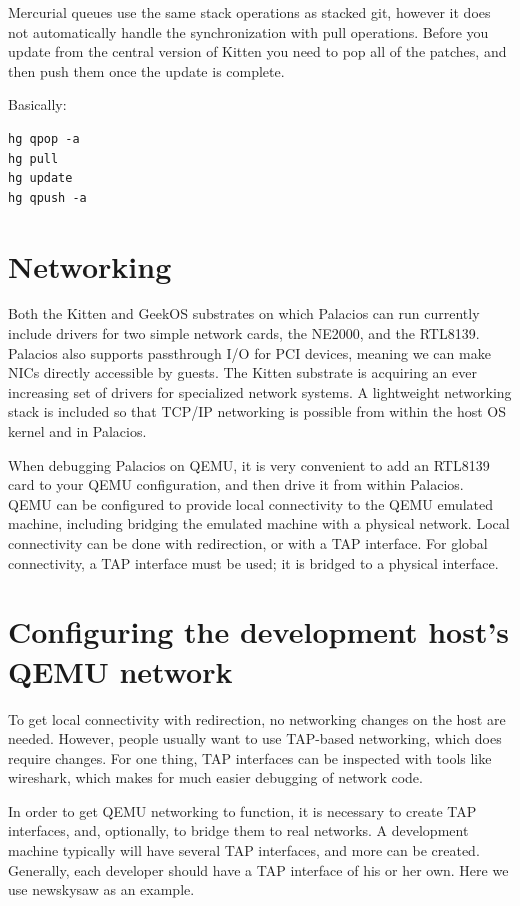 \documentclass[11pt]{article}
\begin{document}
Mercurial queues use the same stack operations as stacked git, however
it does not automatically handle the synchronization with pull
operations. Before you update from the central version of Kitten you
need to pop all of the patches, and then push them once the update is
complete.

Basically:
\begin{verbatim}
hg qpop -a
hg pull
hg update
hg qpush -a
\end{verbatim}



\section{Networking}

Both the Kitten and GeekOS substrates on which Palacios can run
currently include drivers for two simple network cards, the NE2000,
and the RTL8139.  Palacios also supports passthrough I/O for PCI
devices, meaning we can make NICs directly accessible by guests. The
Kitten substrate is acquiring an ever increasing set of drivers for
specialized network systems.  A lightweight networking stack is
included so that TCP/IP networking is possible from within the host OS
kernel and in Palacios.

When debugging Palacios on QEMU, it is very convenient to add an
RTL8139 card to your QEMU configuration, and then drive it from within
Palacios.  QEMU can be configured to provide local connectivity to the
QEMU emulated machine, including bridging the emulated machine with a
physical network.  Local connectivity can be done with redirection, or
with a TAP interface.  For global connectivity, a TAP interface must
be used; it is bridged to a physical interface.

\section{Configuring the development host's QEMU network}

To get local connectivity with redirection, no networking changes on
the host are needed.  However, people usually want to use TAP-based
networking, which does require changes.  For one thing, TAP interfaces
can be inspected with tools like wireshark, which makes for much
easier debugging of network code.

In order to get QEMU networking to function, it is necessary to create
TAP interfaces, and, optionally, to bridge them to real networks.  A
development machine typically will have several TAP interfaces, and
more can be created.  Generally, each developer should have a TAP
interface of his or her own.  Here we use newskysaw as an example.
\end{document}
